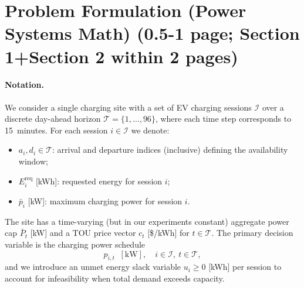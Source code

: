 \documentclass{article}
\begin{document}
\section{Problem Formulation (Power Systems Math) (0.5-1 page; Section 1+Section 2 within 2 pages)}

\paragraph{Notation.}
We consider a single charging site with a set of EV charging sessions $\mathcal{I}$ over a discrete day-ahead horizon $\mathcal{T} = \{1,\dots,96\}$, where each time step corresponds to 15~minutes. For each session $i \in \mathcal{I}$ we denote:
\begin{itemize}
  \item $a_i, d_i \in \mathcal{T}$: arrival and departure indices (inclusive) defining the availability window;
  \item $E_i^{\text{req}}$ [kWh]: requested energy for session $i$;
  \item $\bar{p}_i$ [kW]: maximum charging power for session $i$.
\end{itemize}
The site has a time-varying (but in our experiments constant) aggregate power cap $\bar{P}_t$ [kW] and a TOU price vector $c_t$ [\$/kWh] for $t \in \mathcal{T}$. The primary decision variable is the charging power schedule
\[
p_{i,t} \;\;[\text{kW}], \quad i \in \mathcal{I}, ~ t \in \mathcal{T},
\]
and we introduce an unmet energy slack variable $u_i \ge 0$ [kWh] per session to account for infeasibility when total demand exceeds capacity.
\end{document}
